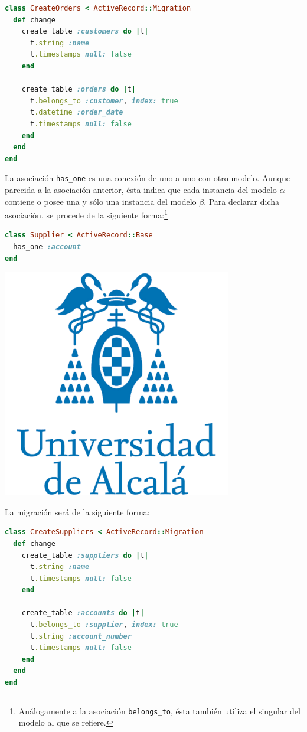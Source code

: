 \begin{lstlisting}[language=Ruby]
class CreateOrders < ActiveRecord::Migration
  def change
    create_table :customers do |t|
      t.string :name
      t.timestamps null: false
    end
 
    create_table :orders do |t|
      t.belongs_to :customer, index: true
      t.datetime :order_date
      t.timestamps null: false
    end
  end
end
\end{lstlisting}


La asociación \texttt{has\_one} es una conexión de uno-a-uno con otro modelo. Aunque parecida a la asociación anterior, ésta indica que cada instancia del modelo $\alpha$ contiene o posee una y sólo una instancia del modelo $\beta$. Para declarar dicha asociación, se procede de la siguiente forma:\footnote{Análogamente a la asociación \texttt{belongs\_to}, ésta también utiliza el singular del modelo al que se refiere.}

\begin{lstlisting}[language=Ruby]
class Supplier < ActiveRecord::Base
  has_one :account
end
\end{lstlisting}

\includegraphics[width=10cm]{./image/logos/uahlogo3.png}

La migración será de la siguiente forma:

\begin{lstlisting}[language=Ruby]
class CreateSuppliers < ActiveRecord::Migration
  def change
    create_table :suppliers do |t|
      t.string :name
      t.timestamps null: false
    end
 
    create_table :accounts do |t|
      t.belongs_to :supplier, index: true
      t.string :account_number
      t.timestamps null: false
    end
  end
end
\end{lstlisting}
